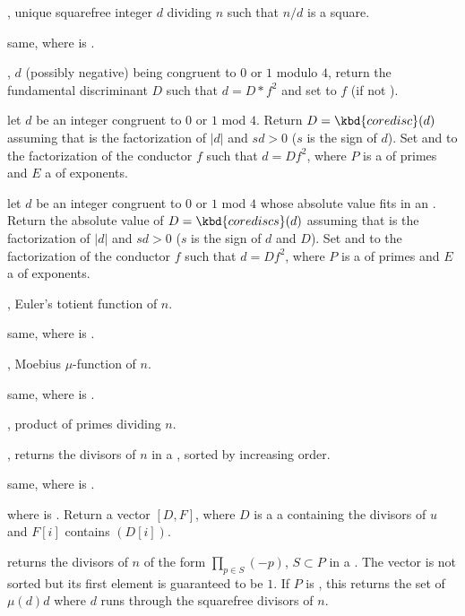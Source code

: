 , unique squarefree integer $d$ dividing $n$ such
that $n/d$ is a square.

 same, where  is .

, $d$ (possibly negative)
being congruent to $0$ or $1$ modulo $4$, return the fundamental
discriminant $D$ such that $d=D*f^2$ and set  to $f$
(if  not ).

 let $d$ be an
integer congruent to $0$ or $1$ mod $4$. Return
$D = \kbd{coredisc}(d)$ assuming that  is the factorization of $|d|$
and $s d > 0$ ($s$ is the sign of $d$). Set  and  to the
factorization of the conductor $f$ such that $d = Df^2$, where $P$ is a
 of primes and $E$ a  of exponents.

 let $d$ be an
integer congruent to $0$ or $1$ mod $4$ whose absolute value fits in an
. Return the absolute value of $D = \kbd{corediscs}(d)$ assuming
that  is the factorization of $|d|$ and $s d > 0$ ($s$ is the sign of
$d$ and $D$). Set  and  to the factorization of the
conductor $f$ such that $d = Df^2$, where $P$ is a  of primes
and $E$ a  of exponents.

, Euler's totient function of $n$.

 same, where  is .

, Moebius $\mu$-function of $n$.

 same, where  is .

, product of primes dividing $n$.

, returns the divisors of $n$ in a
, sorted by increasing order.

 same, where  is .

 where  is .
Return a vector $[D,F]$, where $D$ is a a  containing the
divisors of $u$ and $F[i]$ contains $(D[i])$.

 returns the divisors of $n$ of the form
$\prod_{p\in S} (-p)$, $S\subset P$ in a . The vector is not
sorted but its first element is guaranteed to be $1$. If $P$ is
, this returns the set of $\mu(d) d$ where $d$ runs
through the squarefree divisors of $n$.

